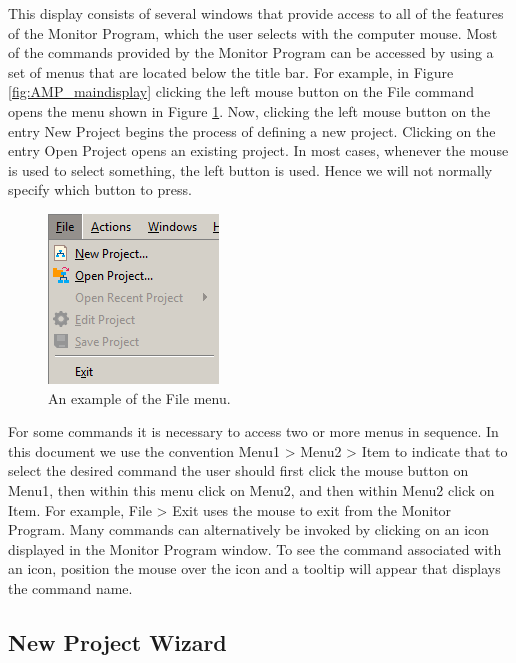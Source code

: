 \documentclass[11pt, twoside, pdftex]{article}
\begin{document}
This display consists of several windows that provide access to all of the features of the Monitor Program, which the user
selects with the computer mouse. Most of the commands 
provided by the Monitor Program can be accessed by using a set of
menus that are located below the title bar. For example, in
Figure \ref{fig:AMP_maindisplay} clicking the left mouse button on the {\sf File} command
opens the menu shown in Figure \ref{fig:AMP_filemenu}. Now, clicking the left mouse 
button on the entry {\sf New Project} begins the process of
defining a new project. Clicking on the entry {\sf Open Project}
opens an existing project. In most cases, whenever the mouse is used to select something, the left button is used. 
Hence we will not normally specify which button to press. 

\begin{figure}[H]
   \begin{center}
      \includegraphics[scale=1]{screenshots/figure4.png}
   \end{center}
   \caption{An example of the {\sf File} menu.} 
   \label{fig:AMP_filemenu}
\end{figure}

For some commands it is necessary to access two or more menus in
sequence. In this document we use the convention 
{\sf Menu1 > Menu2 > Item} to
indicate that to select the desired command 
the user should first click the mouse button on {\sf Menu1}, 
then within this menu click on {\sf Menu2}, and then 
within {\sf Menu2} click on {\sf Item}. For example, 
{\sf File > Exit} uses the mouse to exit from the Monitor
Program. Many commands can alternatively be invoked 
by clicking on an icon displayed in the Monitor Program window. To see the command associated with an icon, position the mouse
over the icon and a tooltip will appear that displays 
the command name.

\subsection{New Project Wizard}
\end{document}
